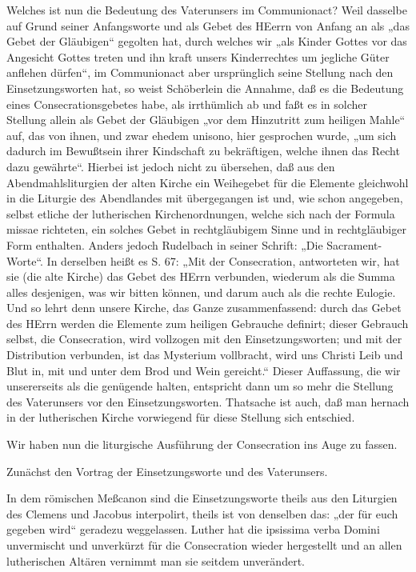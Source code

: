 Welches ist nun die Bedeutung des Vaterunsers im Communionact? Weil dasselbe auf Grund seiner Anfangsworte und als Gebet des HEerrn von Anfang an als „das Gebet der Gläubigen“ gegolten hat, durch welches wir „als Kinder Gottes vor das Angesicht Gottes treten und ihn kraft unsers Kinderrechtes um jegliche Güter anflehen dürfen“, im Communionact aber ursprünglich seine Stellung nach den Einsetzungsworten hat, so weist Schöberlein die Annahme, daß es die Bedeutung eines Consecrationsgebetes habe, als irrthümlich ab und faßt es in solcher Stellung allein als Gebet der Gläubigen „vor dem Hinzutritt zum heiligen Mahle“ auf, das von ihnen, und zwar
ehedem unisono, hier gesprochen wurde, „um sich dadurch im Bewußtsein ihrer Kindschaft zu bekräftigen, welche ihnen das Recht dazu gewährte“. Hierbei ist jedoch nicht zu übersehen, daß aus den Abendmahlsliturgien der alten Kirche ein Weihegebet für die Elemente gleichwohl in die Liturgie des Abendlandes mit übergegangen ist und, wie schon angegeben, selbst etliche der lutherischen Kirchenordnungen, welche sich nach der Formula missae richteten, ein solches Gebet in rechtgläubigem Sinne und in rechtgläubiger Form enthalten. Anders jedoch Rudelbach in seiner Schrift: „Die Sacrament-Worte“. In derselben heißt es S. 67: „Mit der Consecration, antworteten wir, hat sie (die alte Kirche) das Gebet des HErrn verbunden, wiederum als die Summa alles desjenigen, was wir bitten können, und darum auch als die rechte Eulogie. Und so lehrt denn unsere Kirche, das Ganze zusammenfassend: durch das Gebet des HErrn werden die Elemente zum heiligen Gebrauche definirt; dieser Gebrauch selbst, die Consecration, wird vollzogen mit den Einsetzungsworten; und mit der Distribution verbunden, ist das Mysterium vollbracht, wird uns Christi Leib und Blut in, mit und unter dem Brod und Wein gereicht.“ Dieser Auffassung, die wir unsererseits als die genügende halten, entspricht dann um so mehr die Stellung des Vaterunsers vor den Einsetzungsworten. Thatsache ist auch, daß man hernach in der lutherischen Kirche vorwiegend für diese Stellung sich entschied.

Wir haben nun die liturgische Ausführung der Consecration ins Auge zu fassen.

Zunächst den Vortrag der Einsetzungsworte und des Vaterunsers.

In dem römischen Meßcanon sind die Einsetzungsworte theils aus den Liturgien des Clemens und Jacobus interpolirt, theils ist von denselben das: „der für euch gegeben wird“ geradezu weggelassen. Luther hat die ipsissima verba Domini unvermischt und unverkürzt für die Consecration wieder hergestellt und an allen lutherischen Altären vernimmt man sie seitdem unverändert.


